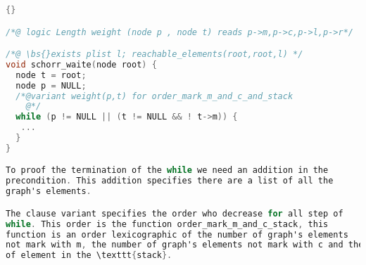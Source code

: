 \begin{lstlisting}[language=C]{}

/*@ logic Length weight (node p , node t) reads p->m,p->c,p->l,p->r*/

/*@ \bs{}exists plist l; reachable_elements(root,root,l) */
void schorr_waite(node root) {
  node t = root;
  node p = NULL;
  /*@variant weight(p,t) for order_mark_m_and_c_and_stack 
    @*/
  while (p != NULL || (t != NULL && ! t->m)) {
   ...
  }
}

To proof the termination of the while we need an addition in the
precondition. This addition specifies there are a list of all the
graph's elements.

The clause variant specifies the order who decrease for all step of
while. This order is the function order_mark_m_and_c_stack, this
function is an order lexicographic of the number of graph's elements
not mark with m, the number of graph's elements not mark with c and the number
of element in the \texttt{stack}. 


\end{lstlisting}

